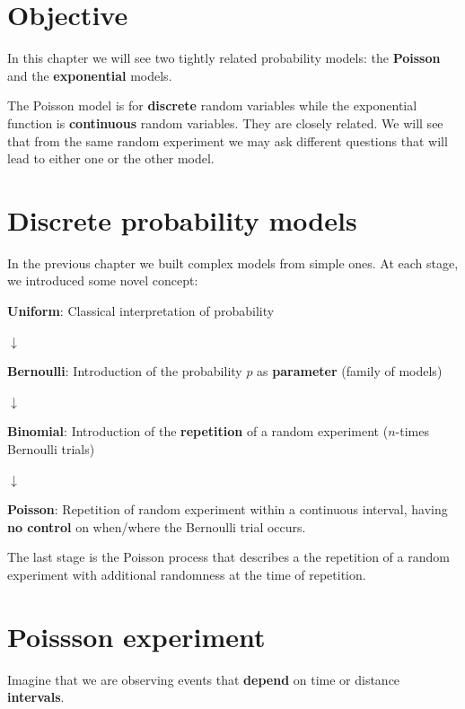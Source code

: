 \documentclass[
]{book}
\begin{document}
\hypertarget{objective-3}{%
\section{Objective}\label{objective-3}}

In this chapter we will see two tightly related probability models: the \textbf{Poisson} and the \textbf{exponential} models.

The Poisson model is for \textbf{discrete} random variables while the exponential function is \textbf{continuous} random variables. They are closely related. We will see that from the same random experiment we may ask different questions that will lead to either one or the other model.

\hypertarget{discrete-probability-models-1}{%
\section{Discrete probability models}\label{discrete-probability-models-1}}

In the previous chapter we built complex models from simple ones. At each stage, we introduced some novel concept:

\textbf{Uniform}: Classical interpretation of probability

\(\downarrow\)

\textbf{Bernoulli}: Introduction of the probability \(p\) as \textbf{parameter} (family of models)

\(\downarrow\)

\textbf{Binomial}: Introduction of the \textbf{repetition} of a random experiment (\(n\)-times Bernoulli trials)

\(\downarrow\)

\textbf{Poisson}: Repetition of random experiment within a continuous interval, having \textbf{no control} on when/where the Bernoulli trial occurs.

The last stage is the Poisson process that describes a the repetition of a random experiment with additional randomness at the time of repetition.

\hypertarget{poissson-experiment}{%
\section{Poissson experiment}\label{poissson-experiment}}

Imagine that we are observing events that \textbf{depend} on time or distance \textbf{intervals}.
\end{document}

